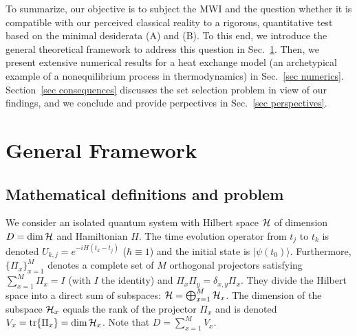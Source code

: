 \documentclass[pre,twocolumn,10pt,aps,longbibliography,nofootinbib]{revtex4-1}
\newcommand{\C}[1]{{\cal{#1}}}
\newcommand{\blue}[1]{#1}
\newcommand{\new}[1]{#1}
\begin{document}
To summarize, our objective is to subject the MWI and the question whether it is compatible with our perceived classical reality to a rigorous, quantitative test based on the minimal desiderata (A) and (B). To this end, we introduce the general theoretical framework to address this question in Sec.~\ref{sec frame}. Then, we present extensive numerical results for a heat exchange model (an archetypical example of a nonequilibrium process in thermodynamics) in Sec.~\ref{sec numerics}.  Section~\ref{sec consequences} discusses \blue{the set selection problem in view of our findings,} and we conclude and provide perpectives in Sec.~\ref{sec perspectives}.

\section{\new{General Framework}}
\label{sec frame}

\subsection{\new{Mathematical definitions and problem}}
\label{sec math def}

We consider an isolated quantum system with Hilbert space $\C H$ of dimension $D=\dim\C H$ and Hamiltonian $H$. The time evolution operator from $t_j$ to $t_k$ is denoted $U_{k,j} = e^{-iH(t_k-t_j)}$ ($\hbar\equiv1$) and the initial state is $|\psi(t_0)\rangle$. Furthermore, $\{\Pi_x\}_{x=1}^M$ denotes a complete set of $M$ orthogonal projectors satisfying $\sum_{x=1}^M \Pi_x = I$ (with $I$ the identity) and $\Pi_x\Pi_y = \delta_{x,y}\Pi_x$. They divide the Hilbert space into a direct sum of subspaces: $\C H = \bigoplus_{x=1}^M\C H_x$. The dimension of the subspace $\C H_x$ equals the rank of the projector $\Pi_x$ and is denoted $V_x = \mbox{tr}\{\Pi_x\} = \dim\C H_x$. Note that $D = \sum_{x=1}^M V_x$.
\end{document}
